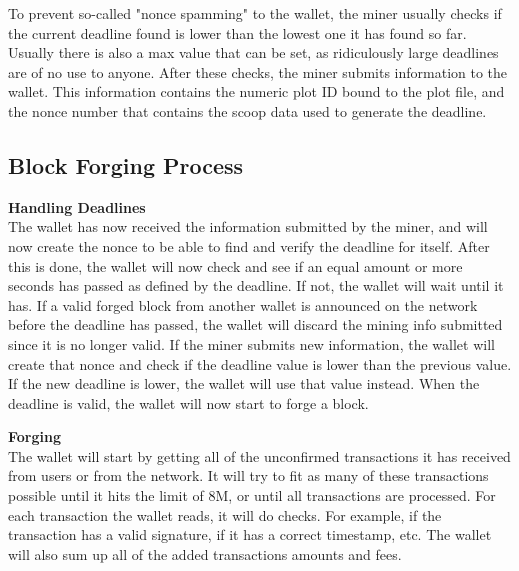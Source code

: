 
\begin{flushleft}
    To prevent so-called "nonce spamming" to the wallet, the miner usually checks if the current deadline found is lower than the lowest one it has found so far. Usually there is also a max value that can be set, as ridiculously large deadlines are of no use to anyone. After these checks, the miner submits information to the wallet. This information contains the numeric plot ID bound to the plot file, and the nonce number that contains the scoop data used to generate the deadline.
\end{flushleft}
\subsection{Block Forging Process}
\begin{flushleft}
    \textbf{Handling Deadlines}\\
The wallet has now received the information submitted by the miner, and will now create the nonce to be able to find and verify the deadline for itself. After this is done, the wallet will now check and see if an equal amount or more seconds has passed as defined by the deadline. If not, the wallet will wait until it has. If a valid forged block from another wallet is announced on the network before the deadline has passed, the wallet will discard the mining info submitted since it is no longer valid. If the miner submits new information, the wallet will create that nonce and check if the deadline value is lower than the previous value. If the new deadline is lower, the wallet will use that value instead. When the deadline is valid, the wallet will now start to forge a block.
\end{flushleft}
\begin{flushleft}
    \textbf{Forging}\\
    The wallet will start by getting all of the unconfirmed transactions it has received from users or from the network. It will try to fit as many of these transactions possible until it hits the limit of 8M, or until all transactions are processed. For each transaction the wallet reads, it will do checks. For example, if the transaction has a valid signature, if it has a correct timestamp, etc. The wallet will also sum up all of the added transactions amounts and fees.
\end{flushleft}
